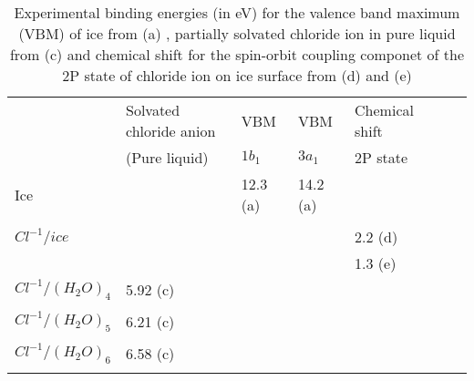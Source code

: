 \documentclass[a4paper,11pt]{report}
\begin{document}
\begin{table}[H]\small
\begin{center}
\captionsetup{font=footnotesize}
\caption{Experimental binding energies (in eV) for the valence band maximum (VBM) of ice from (a) \citep{henderson2002interaction}, partially solvated chloride ion in pure liquid from (c) \citep{markovich1994photoelectron} and chemical shift for the spin-orbit coupling componet of the 2P state of chloride ion on ice surface from (d) \citep{kong2017coexistence} and (e) \citep{parent2011hcl}} \label{tab:1}
\begin{tabular}{|l|l|l|l|l|l|l|}
\hline
&Solvated chloride anion &\hspace*{0.4cm}VBM&\hspace*{0.4cm}VBM&\hspace*{0.2cm}Chemical shift\\
&\hspace*{0.6cm}(Pure liquid)&\hspace*{0.5cm}$1b_{1}$&\hspace*{0.5cm}$3a_{1}$&\hspace*{0.5cm}2P state\\ 
\hline
Ice&\hspace*{0.4cm}&\hspace*{0.4cm}12.3 (a)&\hspace*{0.4cm}14.2 (a)&\hspace*{0.4cm}\\
&&\hspace*{0.4cm}&&\\
\hline
$Cl^{-1}/ice$&\hspace*{0.4cm}&\hspace*{0.4cm}&\hspace*{0.4cm}&\hspace*{0.4cm}2.2 (d)\\
&&\hspace*{0.4cm}&&\hspace*{0.4cm}1.3 (e)\\
\hline
$Cl^{-1}/(H_{2}O)_{4}$&\hspace*{0.7cm}5.92 (c)&\hspace*{0.4cm}&\hspace*{0.4cm}&\\
&&\hspace*{0.4cm}&&\\
\hline
$Cl^{-1}/(H_{2}O)_{5}$&\hspace*{0.7cm}6.21 (c)&\hspace*{0.4cm}&\hspace*{0.4cm}&\\
&&\hspace*{0.4cm}&&\\
\hline
$Cl^{-1}/(H_{2}O)_{6}$&\hspace*{0.7cm}6.58 (c)&\hspace*{0.4cm}&\hspace*{0.4cm}&\\
&&\hspace*{0.4cm}&&\\
\hline
\end{tabular}
\label{table1o}
\end{center}
\end{table}
\end{document}
